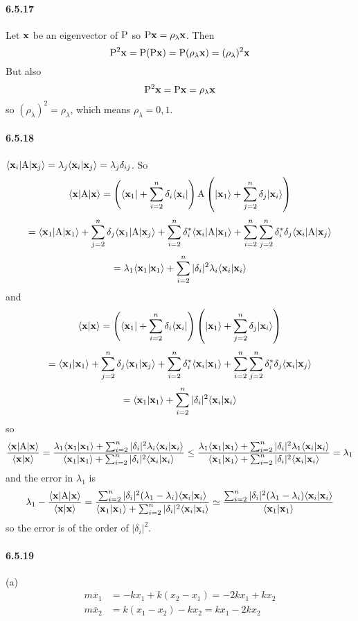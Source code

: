 \documentclass[a4paper]{article}
\begin{document}
\paragraph{6.5.17}
Let $\mathbf{x}$ be an eigenvector of $\mathrm{P}$ so $\mathrm{P}\mathbf{x}=\rho_\lambda\mathbf{x}$. Then
\[
\mathrm{P}^2\mathbf{x}=\mathrm{P}(\mathrm{P}\mathbf{x})=\mathrm{P}(\rho_\lambda\mathbf{x})=(\rho_\lambda)^2\mathbf{x}
\]
But also
\[
\mathrm{P}^2\mathbf{x}=\mathrm{P}\mathbf{x}=\rho_\lambda\mathbf{x}
\]
so $(\rho_\lambda)^2=\rho_\lambda$, which means $\rho_\lambda=0,1$.

\paragraph{6.5.18}
$\langle\mathbf{x}_i|\mathrm{A}|\mathbf{x}_j\rangle=\lambda_j\langle\mathbf{x}_i|\mathbf{x}_j\rangle=\lambda_j\delta_{ij}$. So
\[
\langle\mathbf{x}|\mathrm{A}|\mathbf{x}\rangle=\left( \langle\mathbf{x}_1|+\sum_{i=2}^n\delta_i\langle\mathbf{x}_i| \right)\mathrm{A}\left( |\mathbf{x}_1\rangle+\sum_{j=2}^n\delta_j|\mathbf{x}_i\rangle \right)
\]
\[
=\langle\mathbf{x}_1|\mathrm{A}|\mathbf{x}_1\rangle+\sum_{j=2}^n\delta_j\langle\mathbf{x}_1|\mathrm{A}|\mathbf{x}_j\rangle+\sum_{i=2}^n\delta_i^*\langle\mathbf{x}_i|\mathrm{A}|\mathbf{x}_1\rangle+\sum_{i=2}^n\sum_{j=2}^n\delta_i^*\delta_j\langle\mathbf{x}_i|\mathrm{A}|\mathbf{x}_j\rangle
\]
\[
=\lambda_1\langle\mathbf{x}_1|\mathbf{x}_1\rangle+\sum_{i=2}^n|\delta_i|^2\lambda_i\langle\mathbf{x}_i|\mathbf{x}_i\rangle
\]
and
\[
\langle\mathbf{x}|\mathbf{x}\rangle=\left( \langle\mathbf{x}_1|+\sum_{i=2}^n\delta_i\langle\mathbf{x}_i| \right)\left( |\mathbf{x}_1\rangle+\sum_{j=2}^n\delta_j|\mathbf{x}_i\rangle \right)
\]
\[
=\langle\mathbf{x}_1|\mathbf{x}_1\rangle+\sum_{j=2}^n\delta_j\langle\mathbf{x}_1|\mathbf{x}_j\rangle+\sum_{i=2}^n\delta_i^*\langle\mathbf{x}_i|\mathbf{x}_1\rangle+\sum_{i=2}^n\sum_{j=2}^n\delta_i^*\delta_j\langle\mathbf{x}_i|\mathbf{x}_j\rangle
\]
\[
=\langle\mathbf{x}_1|\mathbf{x}_1\rangle+\sum_{i=2}^n|\delta_i|^2\langle\mathbf{x}_i|\mathbf{x}_i\rangle
\]
so
\[
\frac{\langle\mathbf{x}|\mathrm{A}|\mathbf{x}\rangle}{\langle\mathbf{x}|\mathbf{x}\rangle}=\frac{\lambda_1\langle\mathbf{x}_1|\mathbf{x}_1\rangle+\sum_{i=2}^n|\delta_i|^2\lambda_i\langle\mathbf{x}_i|\mathbf{x}_i\rangle}{\langle\mathbf{x}_1|\mathbf{x}_1\rangle+\sum_{i=2}^n|\delta_i|^2\langle\mathbf{x}_i|\mathbf{x}_i\rangle}\leq
\frac{\lambda_1\langle\mathbf{x}_1|\mathbf{x}_1\rangle+\sum_{i=2}^n|\delta_i|^2\lambda_1\langle\mathbf{x}_i|\mathbf{x}_i\rangle}{\langle\mathbf{x}_1|\mathbf{x}_1\rangle+\sum_{i=2}^n|\delta_i|^2\langle\mathbf{x}_i|\mathbf{x}_i\rangle}=\lambda_1
\]
and the error in $\lambda_1$ is 
\[
\lambda_1-\frac{\langle\mathbf{x}|\mathrm{A}|\mathbf{x}\rangle}{\langle\mathbf{x}|\mathbf{x}\rangle}=\frac{\sum_{i=2}^n|\delta_i|^2(\lambda_1-\lambda_i)\langle\mathbf{x}_i|\mathbf{x}_i\rangle}{\langle\mathbf{x}_1|\mathbf{x}_1\rangle+\sum_{i=2}^n|\delta_i|^2\langle\mathbf{x}_i|\mathbf{x}_i\rangle}\simeq
\frac{\sum_{i=2 }^n|\delta_i|^2(\lambda_1-\lambda_i)\langle\mathbf{x}_i|\mathbf{x}_i\rangle}{\langle\mathbf{x}_1|\mathbf{x}_1\rangle}
\]
so the error is of the order of $|\delta_i|^2$.

\paragraph{6.5.19}
(a) 
\begin{align*}
    m\ddot{x_1}&=-kx_1+k(x_2-x_1)=-2kx_1+kx_2\\
    m\ddot{x_2}&=k(x_1-x_2)-kx_2=kx_1-2kx_2
\end{align*}
\end{document}
